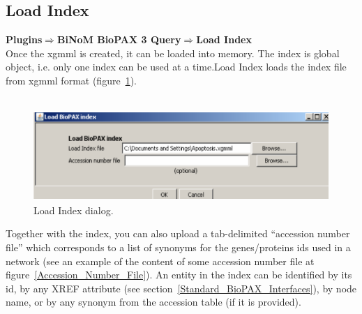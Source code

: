 \subsection{Load Index}
\textbf{Plugins$\Rightarrow$BiNoM BioPAX 3 Query$\Rightarrow$Load Index}\\
Once the xgmml is created, it can be loaded into memory. The index is global object, i.e. only one index can be used at a time.Load Index loads the index file from xgmml format (figure~\ref{Load_Index_Dialog}).\\\\
\begin{figure}[h]
\centering
\includegraphics[width=18 cm]{graphics/Load_Index_Dialog}
\caption{Load Index dialog.}
\label{Load_Index_Dialog}
\end{figure}
Together with the index, you can also upload a tab-delimited “accession number file” which corresponds to a list of synonyms for the genes/proteins ids used in a network (see an example of the content of some accession number file at figure~\ref{Accession_Number_File}). An entity in the index can be identified by its id, by any XREF attribute (see section~\ref{Standard_BioPAX_Interfaces}), by node name, or by any synonym from the accession table (if it is provided).
